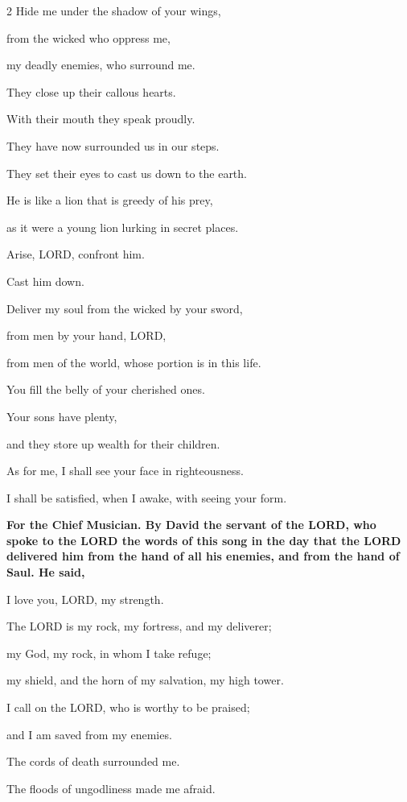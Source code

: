 \begin{multicols}{2}
	Hide me under the shadow of your wings,
	
	
	\myverse{}from the wicked who oppress me,
	
	my deadly enemies, who surround me.
	
	
	\myverse{}They close up their callous hearts.
	
	With their mouth they speak proudly.
	
	
	\myverse{}They have now surrounded us in our steps.
	
	They set their eyes to cast us down to the earth.
	
	
	\myverse{}He is like a lion that is greedy of his prey,
	
	as it were a young lion lurking in secret places.
	
	
	\myverse{}Arise, LORD, confront him.
	
	Cast him down.
	
	Deliver my soul from the wicked by your sword,
	
	
	\myverse{}from men by your hand, LORD,
	
	from men of the world, whose portion is in this life.
	
	You fill the belly of your cherished ones.
	
	Your sons have plenty,
	
	and they store up wealth for their children.
	
	
	\myverse{}As for me, I shall see your face in righteousness.
	
	I shall be satisfied, when I awake, with seeing your form.
	
	
	\mychapter{}\textbf{For the Chief Musician. By David the servant of the LORD, who spoke to the LORD the words of this song in the day that the LORD delivered him from the hand of all his enemies, and from the hand of Saul. He said,}
	
	\myverse*{}I love you, LORD, my strength.
	
	
	\myverse{}The LORD is my rock, my fortress, and my deliverer;
	
	my God, my rock, in whom I take refuge;
	
	my shield, and the horn of my salvation, my high tower.
	
	
	\myverse{}I call on the LORD, who is worthy to be praised;
	
	and I am saved from my enemies.
	
	
	\myverse{}The cords of death surrounded me.
	
	The floods of ungodliness made me afraid.
	

\end{multicols}
